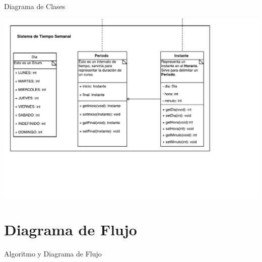 \documentclass[10pt]{beamer}
\begin{document}
\begin{frame}{Diagrama de Clases}
\begin{center}
    \includegraphics[width=\textwidth]{diagramaClases3}
\end{center}
\end{frame}






\section{Diagrama de Flujo}
\begin{frame}{Algoritmo y Diagrama de Flujo}{}
\begin{block}{}



\end{block}
\end{frame}
\end{document}
